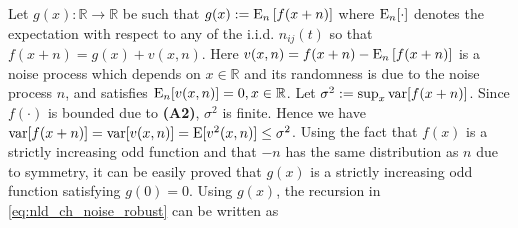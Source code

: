 \documentclass[onecolumn, draft, 12pt]{IEEEtran}
\newcommand{\E}{{\rm E}}
\newcommand{\R}{\mathbb{R}}
\begin{document}
Let $g(x): \R \rightarrow \R$ be such that $g(x) := \E_{n}\left[ f( x + n ) \right]$ where $\E_{n}[\cdot]$ denotes the expectation with respect to any of the i.i.d. $n_{ij}(t)$ so that $f( x + n ) = g(x) + v(x,n)$. Here $v(x,n) = f( x + n ) - \E_{n}\left[ f( x + n ) \right]$ is a noise process which depends on $x \in \R$ and its randomness is due to the noise process $n$, and satisfies $\E_{n} [v(x,n)]=0, x \in \R$. Let $\sigma^2:=\sup_{x} {\rm var}[ f(x+n )]$. Since $f(\cdot)$ is bounded due to \textbf{(A2)}, $\sigma^2$ is finite. Hence we have ${\rm var}[f( x + n )]= {\rm var}[v(x,n)]=\E [v^2(x,n)]\leq \sigma^2$. Using the fact that $f(x)$ is a strictly increasing odd function and that $-n$ has the same distribution as $n$ due to symmetry, it can be easily proved that $g(x)$ is a strictly increasing odd function satisfying $g(0)=0$. Using $g(x)$, the recursion in \eqref{eq:nld_ch_noise_robust} can be written as
\end{document}
